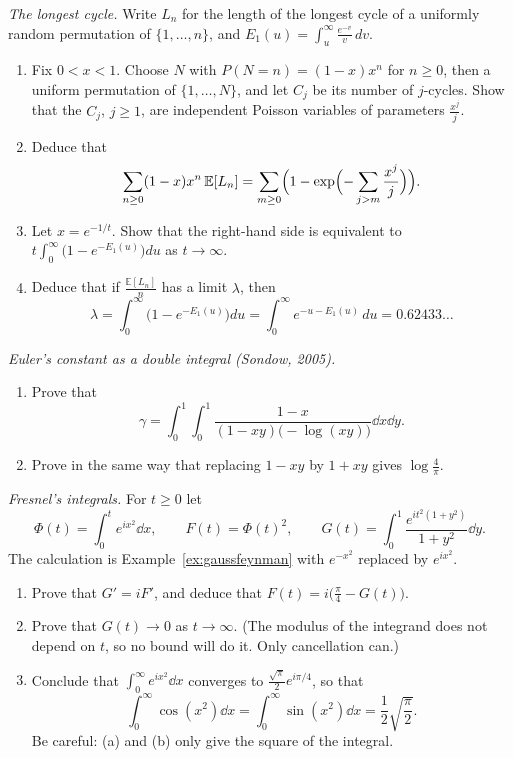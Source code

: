 \begin{exercise}[$\star\star\star$]\label{pb:golomb}
\emph{The longest cycle.} Write $L_n$ for the length of the longest cycle of a uniformly random permutation of
$\{1,\dots,n\}$, and $E_1(u)=\int_u^\infty\frac{e^{-v}}v\,dv$.
\begin{enumerate}[label=(\alph*)]
\item Fix $0<x<1$. Choose $N$ with $P(N=n)=(1-x)x^n$ for $n\ge0$, then a uniform permutation of $\{1,\dots,N\}$, and let
$C_j$ be its number of $j$-cycles. Show that the $C_j$, $j\ge1$, are independent Poisson variables of parameters $\frac{x^j}j$.
\item Deduce that
\[
\sum_{n\ge0}(1-x)x^n\,\mathbb E[L_n]=\sum_{m\ge0}\Bigl(1-\exp\Bigl(-\sum_{j>m}\frac{x^j}j\Bigr)\Bigr).
\]
\item Let $x=e^{-1/t}$. Show that the right-hand side is equivalent to $t\int_0^\infty\bigl(1-e^{-E_1(u)}\bigr)du$ as
$t\to\infty$.
\item Deduce that if $\frac{\mathbb E[L_n]}n$ has a limit $\lambda$, then
\[
\lambda=\int_0^\infty\bigl(1-e^{-E_1(u)}\bigr)du=\int_0^\infty e^{-u-E_1(u)}\,du=0.62433\ldots
\]
\end{enumerate}
\end{exercise}

\begin{exercise}[$\star\star$]\label{pb:sondow}
\emph{Euler's constant as a double integral (Sondow, 2005).}
\begin{enumerate}[label=(\alph*)]
\item Prove that
\[
\gamma=\int_0^1\!\!\int_0^1\frac{1-x}{(1-xy)\bigl(-\log(xy)\bigr)}\dd x\dd y.
\]
\item Prove in the same way that replacing $1-xy$ by $1+xy$ gives $\log\frac4\pi$.
\end{enumerate}
\end{exercise}

\begin{exercise}[$\star\star\star$]\label{ex:fresnel}
\emph{Fresnel's integrals.} For $t\ge0$ let
\[
\Phi(t)=\int_0^te^{ix^2}\dd x,\qquad F(t)=\Phi(t)^2,\qquad G(t)=\int_0^1\frac{e^{it^2(1+y^2)}}{1+y^2}\dd y.
\]
The calculation is Example~\ref{ex:gaussfeynman} with $e^{-x^2}$ replaced by $e^{ix^2}$.
\begin{enumerate}[label=(\alph*)]
\item Prove that $G'=iF'$, and deduce that $F(t)=i\bigl(\frac\pi4-G(t)\bigr)$.
\item Prove that $G(t)\to0$ as $t\to\infty$. (The modulus of the integrand does not depend on $t$, so no bound will do it. Only
cancellation can.)
\item Conclude that $\int_0^\infty e^{ix^2}\dd x$ converges to $\frac{\sqrt\pi}2e^{i\pi/4}$, so that
\[
\int_0^\infty\cos(x^2)\dd x=\int_0^\infty\sin(x^2)\dd x=\frac12\sqrt{\frac\pi2}.
\]
Be careful: (a) and (b) only give the square of the integral.
\end{enumerate}
\end{exercise}

